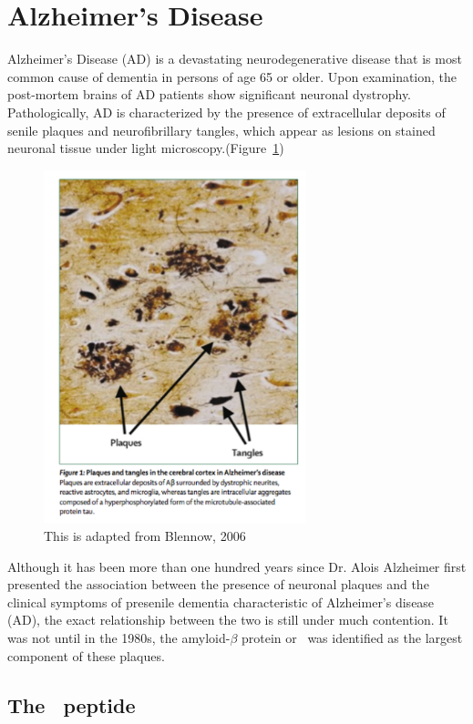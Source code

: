 \section{Alzheimer's Disease}

Alzheimer's Disease (AD) is a devastating neurodegenerative disease that is most common cause of dementia in persons of age 65 or older.  Upon examination, the post-mortem brains of AD patients show significant neuronal dystrophy.  Pathologically, AD is characterized by the presence of extracellular deposits of senile plaques and neurofibrillary tangles, which appear as lesions on stained neuronal tissue under light microscopy.(Figure~\ref{fig:AD_tissue_pathology})

\begin{figure}
  \centering
  \includegraphics[width=3in]{figures/introduction/AD_tissue_pathology.pdf}
  \caption[Image of lesions formed by plaques and NFTs on brain tissue]{This is adapted from Blennow, 2006}
  \label{fig:AD_tissue_pathology}
\end{figure}

Although it has been more than one hundred years since Dr. Alois Alzheimer first presented the association between the presence of neuronal plaques and the clinical symptoms of presenile dementia characteristic of Alzheimer's disease (AD), the exact relationship between the two is still under much contention.  It was not until in the 1980s, the amyloid-$\beta$ protein or \abeta\ was identified as the largest component of these plaques.

\subsection{The \abeta\ peptide}

